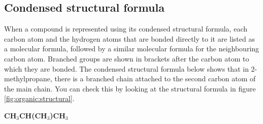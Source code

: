 \subsection{Condensed structural formula}

When a compound is represented using its condensed structural formula, each carbon atom and the hydrogen atoms that are bonded directly to it are listed as a molecular formula, followed by a similar molecular formula for the neighbouring carbon atom. Branched groups are shown in brackets after the carbon atom to which they are bonded. The condensed structural formula below shows that in 2-methylpropane, there is a branched chain attached to the second carbon atom of the main chain. You can check this by looking at the structural formula in figure \ref{fig:organic:structural}. 

\begin{center}
\textbf{CH$_{3}$CH(CH$_{3}$)CH$_{3}$}
\end{center}

